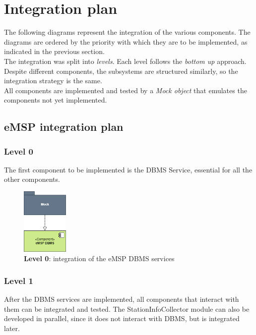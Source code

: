 \documentclass[12pt]{report}
\begin{document}
\section{Integration plan}
The following diagrams represent the integration of the various components. The diagrams are ordered by the priority with which they are to be implemented, as indicated in the previous section.\\
The integration was split into \emph{levels}. Each level follows the \emph{bottom up} approach.\newline
Despite different components, the subsystems are structured similarly, so the integration strategy is the same.\\
All components are implemented and tested by a \emph{Mock object} that emulates the components not yet implemented.

\subsection{eMSP integration plan}

\subsubsection{Level 0}
The first component to be implemented is the DBMS Service, essential for all the other components.

\bigskip
\begin{figure}[ht]
    \centering
    \includegraphics[width=0.2\textwidth]{assets/level0_emsp_integration.png}
    \caption{\textbf{Level 0}: integration of the eMSP DBMS services}
    \label{fig:my_label4323323}
\end{figure}
\clearpage

\subsubsection{Level 1}
After the DBMS services are implemented, all components that interact with them can be integrated and tested. The StationInfoCollector module can also be developed in parallel, since it does not interact with DBMS, but is integrated later.
\end{document}
